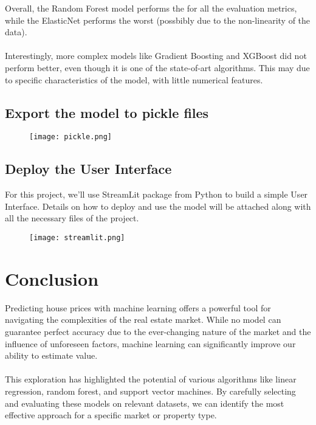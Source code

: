 \documentclass[a4paper, 12pt]{article}
\begin{document}
Overall, the Random Forest model performs the for all the evaluation metrics, while the ElasticNet performs the worst (possbibly due to the non-linearity of the data).\\\\
Interestingly, more complex models like Gradient Boosting and XGBoost did not perform better, even though it is one of the state-of-art algorithms. This may due to specific characteristics of the model, with little numerical features.

\subsection{Export the model to pickle files}

\begin{figure}[tbh]
    \centering
    \texttt{[image: pickle.png]}
\end{figure}

\newpage
\subsection{Deploy the User Interface}

For this project, we'll use StreamLit package from Python to build a simple User Interface. Details on how to deploy and use the model will be attached along with all the necessary files of the project.

\begin{figure}[tbh]
    \centering
    \texttt{[image: streamlit.png]}
\end{figure}

\newpage
\section{Conclusion}
Predicting house prices with machine learning offers a powerful tool for navigating the complexities of the real estate market.  While no model can guarantee perfect accuracy due to the ever-changing nature of the market and the influence of unforeseen factors, machine learning can significantly improve our ability to estimate value.\\\\
This exploration has highlighted the potential of various algorithms like linear regression, random forest, and support vector machines. By carefully selecting and evaluating these models on relevant datasets, we can identify the most effective approach for a specific market or property type.
\end{document}
